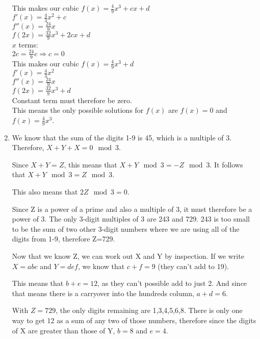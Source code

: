 \documentclass[../main.tex]{subfiles}
\begin{document}
\begin{enumerate}[itemsep=1cm]
    This makes our cubic \(f(x)=\frac{4}{9}x^3+cx+d\)\\

    \(f'(x)=\frac{4}{3}x^2+c\)\\
    \(f''(x)=\frac{24}{9}x\)\\
    \(f(2x)=\frac{32}{9}x^3+2cx+d\)\\

    \(x\) terms:\\
    \(2c=\frac{24}{9}c \Rightarrow c=0\)\\
    
    This makes our cubic \(f(x)=\frac{4}{9}x^3+d\)\\

    \(f'(x)=\frac{4}{3}x^2\)\\
    \(f''(x)=\frac{24}{9}x\)\\
    \(f(2x)=\frac{32}{9}x^3+d\)\\

    Constant term must therefore be zero.\\

    This means the only possible solutions for \(f(x)\) are \(f(x)=0\) and \(f(x)=\frac{4}{9}x^3\).\\
    
    \item 
    
    We know that the sum of the digits 1-9 is 45, which is a multiple of 3. Therefore, $X + Y + X = 0 \mod{3}$.

    Since $X+Y=Z$, this means that $X+Y \mod{3}=-Z\mod{3}$. It follows that $X+Y \mod{3}=Z\mod{3}$.

    This also means that $2Z \mod{3}=0$.

    Since Z is a power of a prime and also a multiple of 3, it must therefore be a power of 3. The only 3-digit multiples of 3 are 243 and 729. 243 is too small to be the sum of two other 3-digit numbers where we are using all of the digits from 1-9, therefore Z=729.

    Now that we know Z, we can work out X and Y by inspection. If we write $X=abc$ and $Y=def$, we know that $c+f=9$ (they can't add to 19).

    This means that $b+e=12$, as they can't possible add to just 2. And since that means there is a carryover into the hundreds column, $a+d=6$.

    With $Z=729$, the only digits remaining are 1,3,4,5,6,8. There is only one way to get 12 as a sum of any two of those numbers, therefore since the digits of X are greater than those of Y, $b=8$ and $e=4$. 


\end{enumerate}
\end{document}
